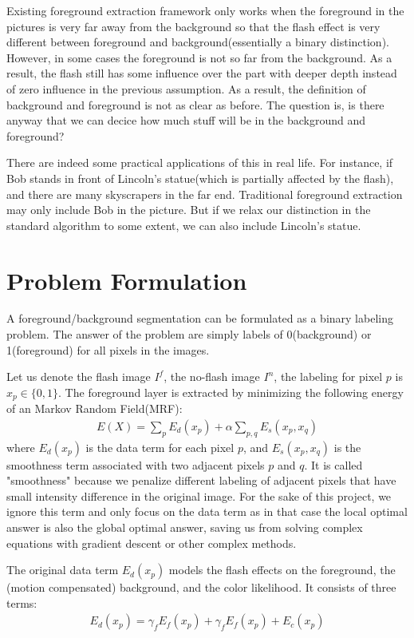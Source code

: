 \documentclass[final]{cvpr}
\begin{document}
Existing foreground extraction framework only works when the foreground in
the pictures is very far away from the background so that the flash effect is very
different between foreground and background(essentially a binary distinction).
However, in some cases the foreground is not so far from the background. As a
result, the flash still has some influence over the part with deeper depth instead
of zero influence in the previous assumption. As a result, the definition of
background and foreground is not as clear as before. The question is, is there 
anyway that we can decice how much stuff will be in the background and foreground?

There are indeed some practical applications of this in real life. For instance, if Bob
stands in front of Lincoln’s statue(which is partially affected by the flash), and
there are many skyscrapers in the far end. Traditional foreground extraction
may only include Bob in the picture. But if we relax our distinction in the standard
algorithm to some extent, we can also include Lincoln’s statue. 

\section{Problem Formulation}
A foreground/background segmentation can be formulated as a binary labeling problem.
The answer of the problem are simply labels of 0(background) or 1(foreground) for all 
pixels in the images. 

Let us denote the flash image $I^f$, the no-flash image $I^n$, the labeling for pixel $p$
is $x_p \in \{0,1\}$. The foreground layer is extracted by minimizing the following energy of 
an Markov Random Field(MRF):
\begin{align}
   E(X) = \sum_{p} E_d(x_p) + \alpha \sum_{p,q}E_s(x_p,x_q)
\end{align}
where $E_d(x_p)$ is the data term for each pixel $p$, and $E_s(x_p,x_q)$ is the 
smoothness term associated with two adjacent pixels $p$ and $q$. It is called 
"smoothness" because we penalize different labeling of adjacent pixels that 
have small intensity difference in the original image. For the sake of this project,
we ignore this term and only focus on the data term as in that case the local optimal 
answer is also the global optimal answer, saving us from solving complex equations with 
gradient descent or other complex methods.

The original data term $E_d(x_p)$ models the flash effects on the
foreground, the (motion compensated) background, and the
color likelihood. It consists of three terms:
\begin{align}
   E_d(x_p) = \gamma_fE_f(x_p) + \gamma_fE_f(x_p) + E_c(x_p)
\end{align}
\end{document}
